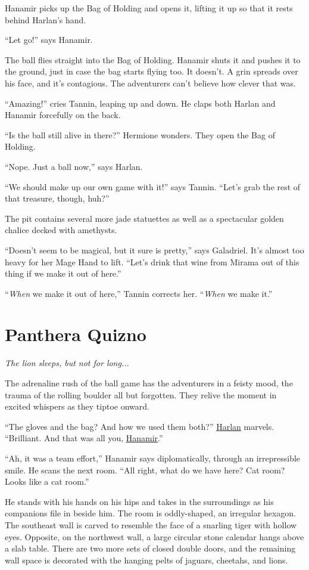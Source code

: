 \documentclass[smalldemyvopaper,11pt,twoside,onecolumn,openright,extrafontsizes]{memoir}
\newcommand{\chapdesc}[1]{
    \begin{flushright}
    \emph{{#1}}
    \end{flushright}
    \vspace{26pt}
}
\begin{document}
Hanamir picks up the Bag of Holding and opens it, lifting it up so that
it rests behind Harlan's hand.

``Let go!'' says Hanamir.

The ball flies straight into the Bag of Holding. Hanamir shuts it and
pushes it to the ground, just in case the bag starts flying too. It
doesn't. A grin spreads over his face, and it's contagious. The
adventurers can't believe how clever that was.

``Amazing!'' cries Tannin, leaping up and down. He claps both Harlan and
Hanamir forcefully on the back.

``Is the ball still alive in there?'' Hermione wonders. They open the
Bag of Holding.

``Nope. Just a ball now,'' says Harlan.

``We should make up our own game with it!'' says Tannin. ``Let's grab
the rest of that treasure, though, huh?''

The pit contains several more jade statuettes as well as a spectacular
golden chalice decked with amethysts.

``Doesn't seem to be magical, but it sure is pretty,'' says Galadriel.
It's almost too heavy for her Mage Hand to lift. ``Let's drink that wine
from Mirama out of this thing if we make it out of here.''

``\emph{When} we make it out of here,'' Tannin corrects her.
``\emph{When} we make it.''


\chapter{Panthera Quizno}
\chapdesc{The lion sleeps, but not for long...}

The adrenaline rush of the ball game has the adventurers in a feisty
mood, the trauma of the rolling boulder all but forgotten. They relive
the moment in excited whispers as they tiptoe onward.

``The gloves and the bag? And how we used them both?''
\href{/characters/harlan/}{Harlan} marvels. ``Brilliant. And that was
all you, \href{/characters/hanamir/}{Hanamir}.''

``Ah, it was a team effort,'' Hanamir says diplomatically, through an
irrepressible smile. He scans the next room. ``All right, what do we
have here? Cat room? Looks like a cat room.''

He stands with his hands on his hips and takes in the surroundings as
his companions file in beside him. The room is oddly-shaped, an
irregular hexagon. The southeast wall is carved to resemble the face of
a snarling tiger with hollow eyes. Opposite, on the northwest wall, a
large circular stone calendar hangs above a slab table. There are two
more sets of closed double doors, and the remaining wall space is
decorated with the hanging pelts of jaguars, cheetahs, and lions.
\end{document}
